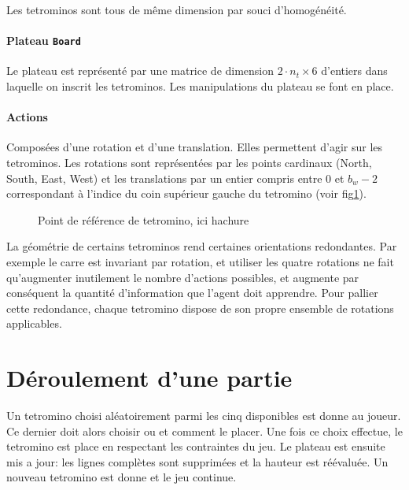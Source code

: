 \documentclass{report}
\begin{document}
Les tetrominos sont tous de même dimension par souci d'homogénéité.

\paragraph{Plateau \texttt{Board}}
Le plateau est représenté par une matrice de dimension
\(2\cdot n_t \times 6\) d'entiers dans laquelle on inscrit les tetrominos. Les
manipulations du plateau se font en place.


\paragraph{Actions}
Composées d'une rotation et d'une translation. Elles permettent d'agir sur les
tetrominos. Les rotations sont représentées par les points cardinaux
(North, South, East, West) et les translations par un entier compris entre 0 et
\(b_w - 2\) correspondant à l'indice du coin supérieur gauche du tetromino
(voir fig\ref{fig:tetref}).

\begin{figure}[h]
  \centering
  \qquad
  \caption{Point de référence de tetromino, ici hachure}\label{fig:tetref}
\end{figure}

La géométrie de certains tetrominos rend certaines orientations redondantes. Par
exemple le carre est invariant par rotation, et utiliser les quatre rotations
ne fait qu'augmenter inutilement le nombre d'actions possibles, et augmente par
conséquent la quantité d'information que l'agent doit apprendre. Pour pallier
cette redondance, chaque tetromino dispose de son propre ensemble de rotations
applicables.

\section{Déroulement d'une partie}
Un tetromino choisi aléatoirement parmi les cinq disponibles est donne au
joueur. Ce dernier doit alors choisir ou et comment le placer. Une fois ce
choix effectue, le tetromino est place en respectant les contraintes du jeu. Le
plateau est ensuite mis a jour: les lignes complètes sont supprimées et la
hauteur est réévaluée. Un nouveau tetromino est donne et le jeu continue.
\end{document}
